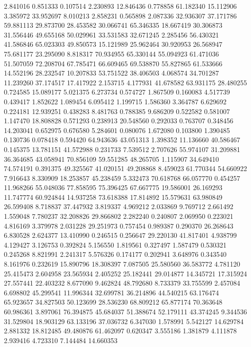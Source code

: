 2.841016
0.851333
0.107514
2.230893
12.846436
0.778858
61.182340
15.112906
3.385972
33.952697
8.010213
2.858231
0.565898
2.087336
32.936307
37.171786
59.881113
29.873700
28.453582
30.066741
65.346335
18.667419
30.306873
31.556446
49.655168
50.029961
33.531583
32.671245
2.285456
56.430321
41.586846
65.023303
49.850573
15.121989
25.962464
30.920953
26.568947
75.681177
23.295090
8.818317
70.934955
65.330144
55.094923
61.471036
51.507059
72.208704
67.785471
66.609465
69.538870
55.827865
61.533666
14.552196
28.232547
10.207833
53.751522
38.406503
4.068574
34.701287
11.239260
37.174517
17.417922
2.153715
4.177931
41.678582
63.931175
28.480255
0.724585
15.089177
5.021375
6.273734
0.574727
1.867509
0.160083
4.517739
0.439417
1.852622
1.089454
6.095412
1.199715
1.586360
3.364787
6.629692
0.224181
12.939251
0.438283
8.481763
0.788385
9.686209
0.522582
0.581007
1.147470
18.808828
0.571293
0.238913
20.548560
0.292033
0.763707
0.348456
14.203041
0.652975
0.676580
5.284601
0.080076
1.672080
0.103800
1.390485
0.130736
0.078418
0.594420
64.943636
43.051313
1.398352
11.136660
40.586467
0.145375
13.781151
41.572988
0.231733
7.539512
2.707626
55.974107
31.209881
36.364685
43.058941
70.856109
59.551285
48.265705
1.115907
34.649410
74.574191
0.391375
49.325567
41.020151
49.208868
8.459023
61.770344
54.660922
7.916643
8.330909
18.253857
45.238459
5.332473
70.618768
66.057770
0.454257
11.968266
55.048036
77.858595
75.396425
67.667775
19.586001
26.169293
11.747774
60.924844
14.937258
73.618388
17.814892
15.579631
63.980849
26.599408
8.718837
37.447932
3.819337
4.969212
2.033869
9.769712
2.661492
1.559048
7.780237
32.208826
29.866802
2.282240
0.240807
2.069950
0.223021
4.816169
3.379978
2.031228
29.251973
0.757454
0.989387
0.290370
26.268643
6.830528
2.624377
13.410990
0.246515
0.256647
29.220130
41.817401
4.938799
4.129427
3.126753
0.392824
5.156550
1.819561
0.327497
1.587479
0.530321
0.245268
8.821991
2.241317
5.576326
0.174177
0.202941
3.648976
0.343540
8.161976
0.232619
15.890796
18.308397
7.087505
25.580560
36.583772
4.781120
25.415473
2.604958
23.565934
2.405252
25.182441
29.014877
14.345721
17.315924
27.557441
22.403232
8.677090
9.462824
48.792680
8.733379
33.755599
2.457084
6.698802
45.299541
11.996344
32.699781
36.214896
44.540215
63.176474
65.923657
34.827503
50.123699
28.536230
68.809212
65.877174
70.363648
60.986361
3.897061
76.394875
45.684037
51.388674
52.179111
43.374245
9.344536
31.529804
18.903129
63.133196
37.036732
6.347030
1.578991
5.542127
14.629784
2.881332
18.812485
49.480876
61.462097
0.620347
3.555186
1.381879
4.111878
2.939416
4.723310
7.144484
14.660353
